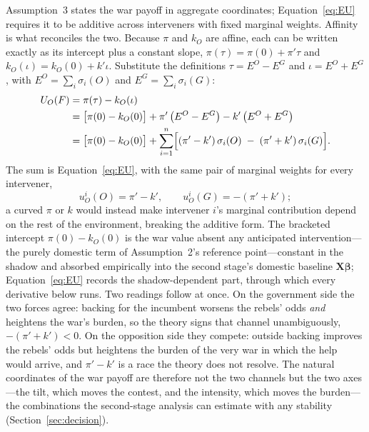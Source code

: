 Assumption~3 states the war payoff in aggregate coordinates;
Equation~\eqref{eq:EU} requires it to be additive across interveners with
fixed marginal weights.  Affinity is what reconciles the two.  Because
$\pi$ and $k_O$ are affine, each can be written exactly as its intercept plus
a constant slope, $\pi(\tau) = \pi(0) + \pi'\tau$ and $k_O(\iota) = k_O(0) +
k'\iota$.  Substitute the definitions $\tau = E^O - E^G$ and $\iota = E^O
+ E^G$, with $E^O = \sum_i \sigma_i(O)$ and $E^G = \sum_i \sigma_i(G)$:
\begin{align*}
  U_O(F) &= \pi(\tau) - k_O(\iota) \\
  &= \bigl[\pi(0) - k_O(0)\bigr] + \pi'\,\bigl(E^O - E^G\bigr)
     - k'\,\bigl(E^O + E^G\bigr) \\
  &= \bigl[\pi(0) - k_O(0)\bigr] + \sum_{i=1}^{n}
     \Bigl[(\pi' - k')\,\sigma_i(O) \;-\; (\pi' + k')\,\sigma_i(G)\Bigr].
\end{align*}
The sum is Equation~\eqref{eq:EU}, with the same pair of marginal weights for
every intervener,
\[
  u_O^i(O) = \pi' - k', \qquad u_O^i(G) = -(\pi' + k');
\]
a curved $\pi$ or $k$ would instead make intervener $i$'s marginal
contribution depend on the rest of the environment, breaking the additive
form.  The bracketed intercept $\pi(0) - k_O(0)$ is the war value absent
any anticipated intervention---the purely domestic term of Assumption~2's
reference point---constant in the shadow and absorbed empirically into the
second stage's domestic baseline $\mathbf{X}\boldsymbol{\beta}$;
Equation~\eqref{eq:EU} records the shadow-dependent part, through which every
derivative below runs.  Two readings follow at once.  On the government side
the two forces agree: backing for the incumbent worsens the rebels' odds
\emph{and} heightens the war's burden, so the theory signs that channel
unambiguously, $-(\pi' + k') < 0$.  On the opposition side they compete:
outside backing improves the rebels' odds but heightens the burden of the
very war in which the help would arrive, and $\pi' - k'$ is a race the theory
does not resolve.  The natural coordinates of the war payoff are therefore
not the two channels but the two axes---the tilt, which moves the contest,
and the intensity, which moves the burden---the combinations the second-stage
analysis can estimate with any stability (Section~\ref{sec:decision}).


